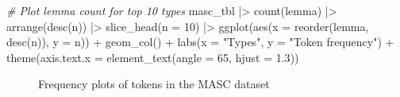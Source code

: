 \documentclass[
  letterpaper,
  DIV=11,
  numbers=noendperiod]{scrreport}
\newenvironment{Shaded}{\begin{snugshade}}{\end{snugshade}}
\newcommand{\AttributeTok}[1]{\textcolor[rgb]{0.00,0.00,0.00}{#1}}
\newcommand{\CommentTok}[1]{\textcolor[rgb]{0.00,0.00,0.00}{\textit{#1}}}
\newcommand{\DecValTok}[1]{\textcolor[rgb]{0.00,0.00,0.00}{#1}}
\newcommand{\FloatTok}[1]{\textcolor[rgb]{0.00,0.00,0.00}{#1}}
\newcommand{\FunctionTok}[1]{\textcolor[rgb]{0.00,0.00,0.00}{#1}}
\newcommand{\NormalTok}[1]{\textcolor[rgb]{0.00,0.00,0.00}{#1}}
\newcommand{\SpecialCharTok}[1]{\textcolor[rgb]{0.00,0.00,0.00}{#1}}
\newcommand{\StringTok}[1]{\textcolor[rgb]{0.00,0.00,0.00}{#1}}
\theoremstyle{definition}
\theoremstyle{remark}
\begin{document}
\begin{Shaded}
\begin{Highlighting}[]
\CommentTok{\# Plot lemma count for top 10 types}
\NormalTok{masc\_tbl }\SpecialCharTok{|\textgreater{}} 
  \FunctionTok{count}\NormalTok{(lemma) }\SpecialCharTok{|\textgreater{}}
  \FunctionTok{arrange}\NormalTok{(}\FunctionTok{desc}\NormalTok{(n)) }\SpecialCharTok{|\textgreater{}}
  \FunctionTok{slice\_head}\NormalTok{(}\AttributeTok{n =} \DecValTok{10}\NormalTok{) }\SpecialCharTok{|\textgreater{}}
  \FunctionTok{ggplot}\NormalTok{(}\FunctionTok{aes}\NormalTok{(}\AttributeTok{x =} \FunctionTok{reorder}\NormalTok{(lemma, }\FunctionTok{desc}\NormalTok{(n)), }\AttributeTok{y =}\NormalTok{ n)) }\SpecialCharTok{+}
  \FunctionTok{geom\_col}\NormalTok{() }\SpecialCharTok{+}
  \FunctionTok{labs}\NormalTok{(}\AttributeTok{x =} \StringTok{"Types"}\NormalTok{, }\AttributeTok{y =} \StringTok{"Token frequency"}\NormalTok{) }\SpecialCharTok{+}
  \FunctionTok{theme}\NormalTok{(}\AttributeTok{axis.text.x =} \FunctionTok{element\_text}\NormalTok{(}\AttributeTok{angle =} \DecValTok{65}\NormalTok{, }\AttributeTok{hjust =} \FloatTok{1.3}\NormalTok{))}
\end{Highlighting}
\end{Shaded}

\begin{figure}

\begin{minipage}[t]{0.33\linewidth}

{\centering 


}

\end{minipage}%
%
\begin{minipage}[t]{0.33\linewidth}

{\centering 


}

\end{minipage}%
%
\begin{minipage}[t]{0.33\linewidth}

{\centering 


}

\end{minipage}%

\caption{\label{fig-eda-masc-count-plots}Frequency plots of tokens in
the MASC dataset}

\end{figure}
\end{document}
